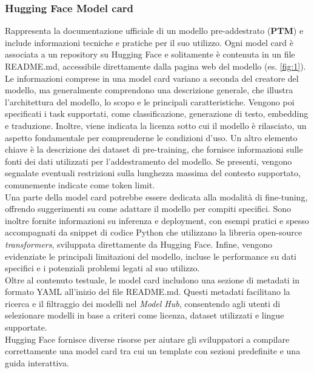 \documentclass{article}
\begin{document}
\subsubsection{Hugging Face Model card} 
Rappresenta la documentazione ufficiale di un modello pre-addestrato (\textbf{PTM})  e include informazioni tecniche e pratiche per il suo utilizzo\cite{huggingface_model_cards}. Ogni model card è associata a un repository su Hugging Face e solitamente è contenuta in un file README.md, accessibile direttamente dalla pagina web del modello (es. \cite{all-MiniLM-L6-v2} \ref{fig:1}).\\
Le informazioni comprese in una model card variano a seconda del creatore del modello, ma generalmente comprendono una descrizione generale, che illustra l'architettura del modello, lo scopo e le principali caratteristiche. Vengono poi specificati i task supportati, come classificazione, generazione di testo, embedding e traduzione. Inoltre, viene indicata la licenza sotto cui il modello è rilasciato, un aspetto fondamentale per comprenderne le condizioni d'uso. Un altro elemento chiave è la descrizione dei dataset di pre-training, che fornisce informazioni sulle fonti dei dati utilizzati per l'addestramento del modello. Se presenti, vengono segnalate eventuali restrizioni sulla lunghezza massima del contesto supportato, comunemente indicate come token limit.\\
Una parte della model card potrebbe essere dedicata alla modalità di fine-tuning, offrendo suggerimenti su come adattare il modello per compiti specifici. Sono inoltre fornite informazioni su inferenza e deployment, con esempi pratici e spesso accompagnati da snippet di codice Python che utilizzano la libreria open-source \textit{transformers}\cite{wolf-etal-2020-transformers}, sviluppata direttamente da Hugging Face. Infine, vengono evidenziate le principali limitazioni del modello, incluse le performance su dati specifici e i potenziali problemi legati al suo utilizzo.\\
Oltre al contenuto testuale, le model card includono una sezione di metadati in formato YAML all'inizio del file README.md. Questi metadati facilitano la ricerca e il filtraggio dei modelli nel \textit{Model Hub}, consentendo agli utenti di selezionare modelli in base a criteri come licenza, dataset utilizzati e lingue supportate.\\
Hugging Face fornisce diverse risorse per aiutare gli sviluppatori a compilare correttamente una model card tra cui un template con sezioni predefinite e una guida interattiva.\\
\end{document}
